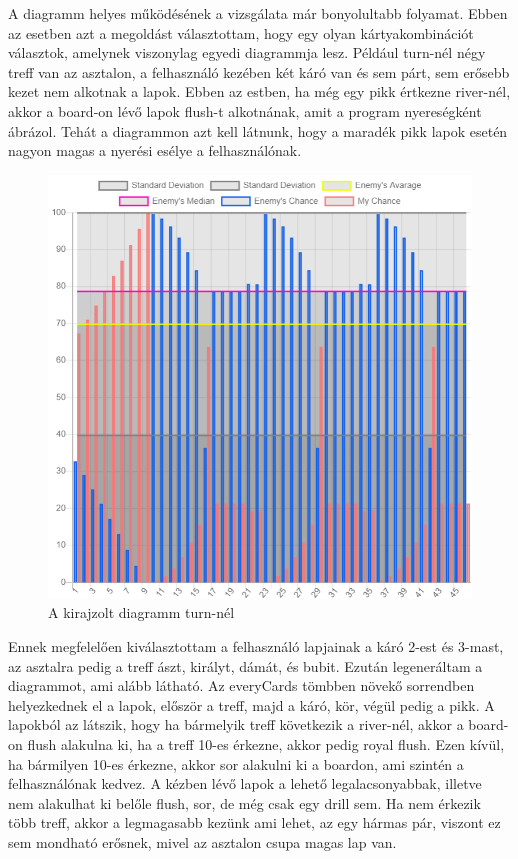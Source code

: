 \newpage

A diagramm helyes működésének a vizsgálata már bonyolultabb folyamat. Ebben az esetben azt a megoldást választottam, hogy egy olyan kártyakombinációt választok, amelynek viszonylag egyedi diagrammja lesz. Például turn-nél négy treff van az asztalon, a felhasználó kezében két káró van és sem párt, sem erősebb kezet nem alkotnak a lapok. Ebben az estben, ha még egy pikk értkezne river-nél, akkor a board-on lévő lapok flush-t alkotnának, amit a program nyereségként ábrázol. Tehát a diagrammon azt kell látnunk, hogy a maradék pikk lapok esetén nagyon magas a nyerési esélye a felhasználónak.

\begin{figure}[h]
\centering
\includegraphics[scale=0.9]{images/chart-test.png}
\caption{A kirajzolt diagramm turn-nél}
\label{fig:chart-test}
\end{figure}

Ennek megfelelően kiválasztottam a felhasználó lapjainak a káró 2-est és 3-mast, az asztalra pedig a treff ászt, királyt, dámát, és bubit. Ezután legeneráltam a diagrammot, ami alább látható. Az everyCards tömbben növekő sorrendben helyezkednek el a lapok, először a treff, majd a káró, kör, végül pedig a pikk. A lapokból az látszik, hogy ha bármelyik treff következik a river-nél, akkor a board-on flush alakulna ki, ha a treff 10-es érkezne, akkor pedig royal flush. Ezen kívül, ha bármilyen 10-es érkezne, akkor sor alakulni ki a boardon, ami szintén a felhasználónak kedvez. A kézben lévő lapok a lehető legalacsonyabbak, illetve nem alakulhat ki belőle flush, sor, de még csak egy drill sem. Ha nem érkezik több treff, akkor a legmagasabb kezünk ami lehet, az egy hármas pár, viszont ez sem mondható erősnek, mivel az asztalon csupa magas lap van. 

